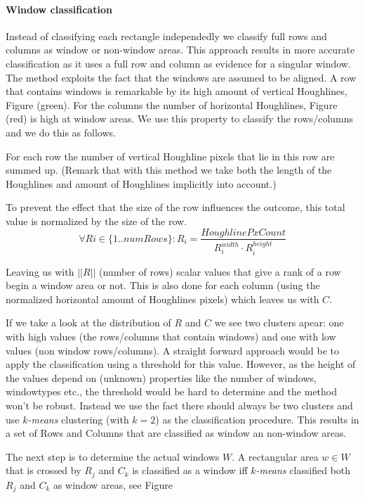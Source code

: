 \paragraph{Window classification}
Instead of classifying each rectangle independedly we classify full rows and
columns as window or non-window areas.  This approach results in more accurate
classification as it uses a full row and column as evidence for a singular
window. The method exploits the fact that the windows are assumed to be
aligned.
A row that contains windows is remarkable by its high amount of vertical
Houghlines, Figure %
(green). For the columns the number of horizontal Houghlines, Figure %
 (red) is high at window areas.  We use this property to classify 
 the rows/columns and we do this as follows.

For each row the number of vertical Houghline pixels that lie in this row are summed up.
(Remark that with this method we take both the length of the Houghlines and amount of Houghlines 
implicitly into account.)

To prevent the effect that the size of the row influences the outcome, this total value
is normalized by the size of the row.
\[\forall Ri\in \{1..numRows\} : R_i = \frac{HoughlinePxCount}{R_i^{width} \cdot R_i^{height}}\]

Leaving us with $||R||$ (number of rows) scalar values that give a rank of a row begin a window area or not.
This is also done for each column (using the normalized horizontal amount of
Houghlines pixels) which leaves us with $C$.

If we take a look at the distribution of $R$ and $C$ we see two clusters apear: one with
high values (the rows/columns that contain windows) and one with low values (non window
rows/columns).  A straight forward approach would be to apply the classification using a
threshold for this value.  However, as the height of the values depend on
(unknown) properties like the number of windows, windowtypes etc., the threshold
would be hard to determine and the method won't be robust. Instead we use the fact 
there should always be two clusters and use \emph{$k$-means}
clustering (with $k=2$) as the classification procedure.
This results in a set of Rows and Columns that are classified as window an
non-window areas.

The next step is to determine the actual windows $W$.
A rectangular area $w\in W$ that is crossed by $R_j$ and $C_k$ is classified as a
window iff \emph{$k$-means} classified both $R_j$ and $C_k$ as window areas, see
Figure %

